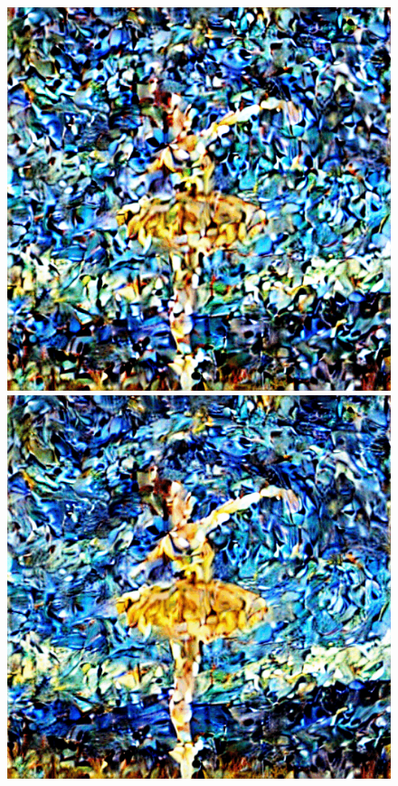 \begin{figure}[h]
\begin{minipage}{0.10\textwidth}
    \end{minipage}
    \begin{minipage}{0.10\textwidth}
        \centering
        \includegraphics[width=\textwidth]{images/diffusion_models/noise_to_image_gif/4.png}
    \end{minipage}
    \begin{minipage}{0.10\textwidth}
        \centering
        \includegraphics[width=\textwidth]{images/diffusion_models/noise_to_image_gif/5.png}

\end{minipage}
\end{figure}
